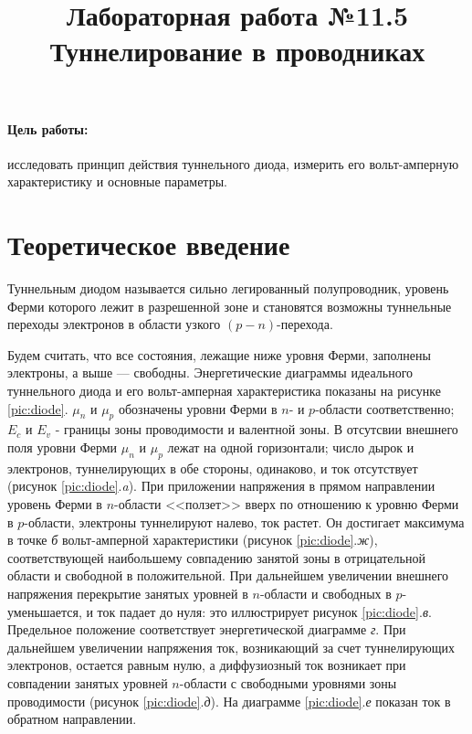 \documentclass[a4paper]{article}
\title{Лабораторная работа №11.5\\
Туннелирование в проводниках}
\begin{document}
	\maketitle

	\paragraph*{Цель работы:} исследовать принцип действия туннельного диода, измерить его вольт-амперную характеристику и основные параметры. 
	
	
	
	\section{Теоретическое введение}
	
	Туннельным диодом называется сильно легированный полупроводник, уровень Ферми которого лежит в разрешенной зоне и становятся возможны туннельные переходы электронов в области узкого $(p-n)$-перехода. 
	
	Будем считать, что все состояния, лежащие ниже уровня Ферми, заполнены электроны, а выше --- свободны. Энергетические диаграммы идеального туннельного диода и его вольт-амперная характеристика показаны на рисунке \ref{pic:diode}. $\mu_n$ и $\mu_p$ обозначены уровни Ферми в $n$- и $p$-области соответственно; $E_c$ и $E_v$ - границы зоны проводимости и валентной зоны. В отсутсвии внешнего поля уровни Ферми $\mu_n$ и $\mu_p$ лежат на одной горизонтали; число дырок и электронов, туннелирующих в обе стороны, одинаково, и ток отсутствует (рисунок \ref{pic:diode}.\textit{a}). При приложении напряжения в прямом направлении уровень Ферми в $n$-области <<ползет>> вверх по отношению к уровню Ферми в $p$-области, электроны туннелируют налево, ток растет. Он достигает максимума в точке \textit{б} вольт-амперной характеристики (рисунок \ref{pic:diode}.\textit{ж}), соответствующей наибольшему совпадению занятой зоны в отрицательной области и свободной в положительной. При дальнейшем увеличении внешнего напряжения перекрытие занятых уровней в $n$-области и свободных в $p$- уменьшается, и ток падает до нуля: это иллюстрирует рисунок \ref{pic:diode}.\textit{в}. Предельное положение соответствует энергетической диаграмме \textit{г}. При дальнейшем увеличении напряжения ток, возникающий за счет туннелирующих электронов, остается равным нулю, а диффузиозный ток возникает при совпадении занятых уровней $n$-области с свободными уровнями зоны проводимости (рисунок \ref{pic:diode}.\textit{д}). На диаграмме \ref{pic:diode}.\textit{е} показан ток в обратном направлении. 
	
\end{document}
